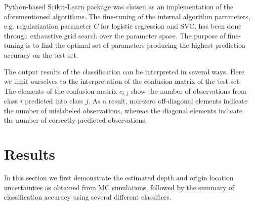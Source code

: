 Python-based Scikit-Learn package was chosen as an implementation of the aforementioned algorithms. The fine-tuning of the internal algorithm parameters, e.g. regularization parameter $C$ for logistic regression and SVC, has been done through exhaustive grid search over the parameter space. The purpose of fine-tuning is to find the optimal set of parameters producing the highest prediction accuracy on the test set.

The output results of the classification can be interpreted in several ways. Here we limit ourselves to the interpretation of the confusion matrix of the test set. The elements of the confusion matrix $c_{i,j}$ show the number of observations from class $i$ predicted into class $j$. As a result, non-zero off-diagonal elements indicate the number of mislabeled observations, whereas the diagonal elements indicate the number of correctly predicted observations.
\section{Results}
In this section we first demonstrate the estimated depth and origin location uncertainties as obtained from MC simulations, followed by the summary of classification accuracy using several different classifiers.
